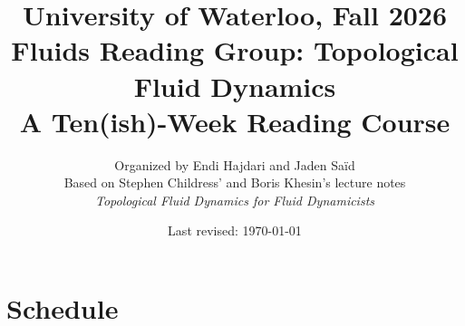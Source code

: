\documentclass{article}
\title{
    {\large University of Waterloo, Fall 2026}\\[0.4em]
    {\huge\bfseries Fluids Reading Group: Topological Fluid Dynamics}\\[0.4em]
    {\Large A Ten(ish)-Week Reading Course}
}
\author{
    {\large Organized by Endi Hajdari and Jaden Saïd}\\[1.2em]
    {\normalsize Based on Stephen Childress' and Boris Khesin's lecture notes}\\[0.2em]
    {\normalsize\itshape Topological Fluid Dynamics for Fluid Dynamicists}
}
\date{
    \vspace{0.5cm}
    {\small Last revised: \today}
}
\begin{document}
\maketitle

\section{Schedule}
\end{document}
